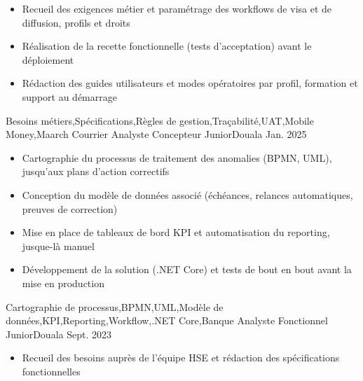 \begin{experiences}
{\begin{itemize}
                        \item Recueil des exigences métier et paramétrage des workflows de visa et de diffusion, profils et droits
                        \item Réalisation de la recette fonctionnelle (tests d'acceptation) avant le déploiement
                        \item Rédaction des guides utilisateurs et modes opératoires par profil, formation et support au démarrage
                      \end{itemize}
                    }
                    {Besoins métiers,Spécifications,Règles de gestion,Traçabilité,UAT,Mobile Money,Maarch Courrier}
  \emptySeparator
     {Analyste Concepteur Junior}{}{Douala}
    {Jan. 2025} {
                      \begin{itemize}
                        \item Cartographie du processus de traitement des anomalies (BPMN, UML), jusqu'aux plans d'action correctifs
                        \item Conception du modèle de données associé (échéances, relances automatiques, preuves de correction)
                        \item Mise en place de tableaux de bord KPI et automatisation du reporting, jusque-là manuel
                        \item Développement de la solution (.NET Core) et tests de bout en bout avant la mise en production
                      \end{itemize}
                    }
                    {Cartographie de processus,BPMN,UML,Modèle de données,KPI,Reporting,Workflow,.NET Core,Banque}
  \emptySeparator
     {Analyste Fonctionnel Junior}{}{Douala}
    {Sept. 2023} {
                      \begin{itemize}
                        \item Recueil des besoins auprès de l'équipe HSE et rédaction des spécifications fonctionnelles

\end{itemize}}
\end{experiences}
